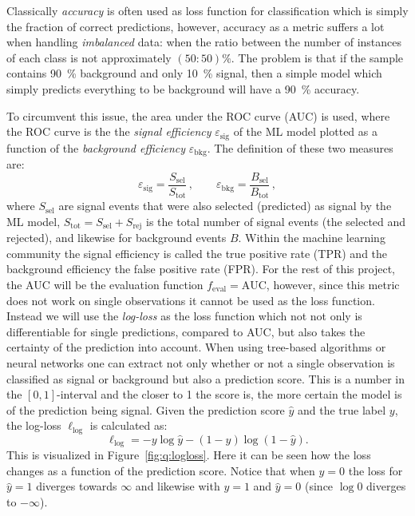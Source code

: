 Classically \emph{accuracy} is often used as loss function for classification which is simply the fraction of correct predictions, however, accuracy as a metric suffers a lot when handling \emph{imbalanced} data: when the ratio between the number of instances of each class is not approximately $(50:50)\si{\percent}$. The problem is that if the sample contains \SI{90}{\percent} background and only \SI{10}{\percent} signal, then a simple model which simply predicts everything to be background will have a \SI{90}{\percent} accuracy.

To circumvent this issue, the area under the ROC curve (AUC) is used, where the ROC curve is the the \emph{signal efficiency} $\varepsilon_\mathrm{sig}$ of the ML model plotted as a function of the \emph{background efficiency} $\varepsilon_\mathrm{bkg}$. The definition of these two measures are:
\begin{equation}
  \varepsilon_\mathrm{sig} = \frac{S_\mathrm{sel}}{S_\mathrm{tot}}\,, \qquad \varepsilon_\mathrm{bkg} = \frac{B_\mathrm{sel}}{B_\mathrm{tot}}\,,
\end{equation}
where $S_\mathrm{sel}$ are signal events that were also selected (predicted) as signal by the ML model, $S_\mathrm{tot}=S_\mathrm{sel}+S_\mathrm{rej}$ is the total number of signal events (the selected and rejected), and likewise for background events $B$. Within the machine learning community the signal efficiency is called the true positive rate (TPR) and the background efficiency the false positive rate (FPR). For the rest of this project, the AUC will be the evaluation function $f_\mathrm{eval} = \mathrm{AUC}$, however, since this metric does not work on single observations it cannot be used as the loss function. Instead we will use the \emph{log-loss} as the loss function which not not only is differentiable for single predictions, compared to AUC, but also takes the certainty of the prediction into account. When using tree-based algorithms or neural networks one can extract not only whether or not a single observation is classified as signal or background but also a prediction score. This is a number in the $[0, 1]$-interval and the closer to \num{1} the score is, the more certain the model is of the prediction being signal. Given the prediction score $\hat{y}$ and the true label $y$, the log-loss $\ell_\mathrm{log}$ is calculated as:
\begin{equation}
    \ell_\mathrm{log} = -y \log{\hat{y}} - (1-y) \log{(1-\hat{y})}.
\end{equation}
This is visualized in Figure~\ref{fig:q:logloss}. Here it can be seen how the loss changes as a function of the prediction score. Notice that when $y=0$ the loss for $\hat{y}=1$ diverges towards $\infty$ and likewise with $y=1$ and $\hat{y}=0$ (since $\log 0$ diverges to $-\infty$).

